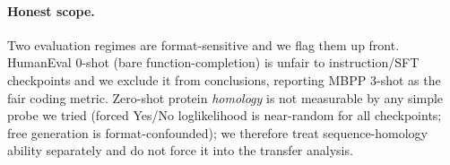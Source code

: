 \paragraph{Honest scope.} Two evaluation regimes are format-sensitive and we flag them up front.
HumanEval 0-shot (bare function-completion) is unfair to instruction/SFT checkpoints and we
exclude it from conclusions, reporting MBPP 3-shot as the fair coding metric. Zero-shot protein
\emph{homology} is not measurable by any simple probe we tried (forced Yes/No loglikelihood is
near-random for all checkpoints; free generation is format-confounded); we therefore treat
sequence-homology ability separately and do not force it into the transfer analysis.
